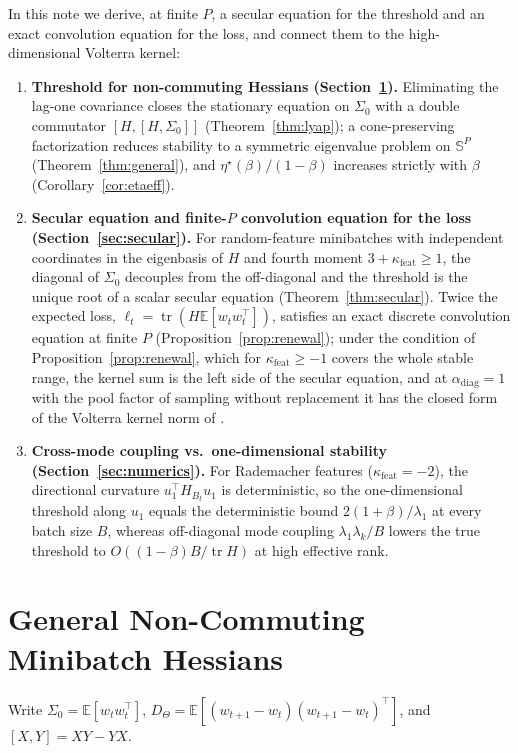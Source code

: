 \documentclass[11pt]{article}
\theoremstyle{remark}
\newcommand{\E}{\mathbb{E}}
\newcommand{\tr}{\operatorname{tr}}
\begin{document}
In this note we derive, at finite $P$, a secular equation for the threshold and an exact convolution equation for the loss, and connect them to the high-dimensional Volterra kernel:
\begin{enumerate}
\item \textbf{Threshold for non-commuting Hessians (Section~\ref{sec:general}).} Eliminating the lag-one covariance closes the stationary equation on $\Sigma_0$ with a double commutator $[H,[H,\Sigma_0]]$ (Theorem~\ref{thm:lyap}); a cone-preserving factorization reduces stability to a symmetric eigenvalue problem on $\mathbb S^P$ (Theorem~\ref{thm:general}), and $\eta^\star(\beta)/(1-\beta)$ increases strictly with $\beta$ (Corollary~\ref{cor:etaeff}).
\item \textbf{Secular equation and finite-$P$ convolution equation for the loss (Section~\ref{sec:secular}).} For random-feature minibatches with independent coordinates in the eigenbasis of $H$ and fourth moment $3+\kappa_{\mathrm{feat}} \ge 1$, the diagonal of $\Sigma_0$ decouples from the off-diagonal and the threshold is the unique root of a scalar secular equation (Theorem~\ref{thm:secular}). Twice the expected loss, $\ell_t = \tr(H\E[w_t w_t^\top])$, satisfies an exact discrete convolution equation at finite $P$ (Proposition~\ref{prop:renewal}); under the condition of Proposition~\ref{prop:renewal}, which for $\kappa_{\mathrm{feat}}\ge-1$ covers the whole stable range, the kernel sum is the left side of the secular equation, and at $\alpha_{\mathrm{diag}}=1$ with the pool factor of sampling without replacement it has the closed form of the Volterra kernel norm of \citet{lee2022minibatch}.
\item \textbf{Cross-mode coupling vs.\ one-dimensional stability (Section~\ref{sec:numerics}).} For Rademacher features ($\kappa_{\mathrm{feat}} = -2$), the directional curvature $u_1^\top H_{B_t} u_1$ is deterministic, so the one-dimensional threshold along $u_1$ equals the deterministic bound $2(1+\beta)/\lambda_1$ at every batch size $B$, whereas off-diagonal mode coupling $\lambda_1\lambda_k/B$ lowers the true threshold to $O((1-\beta)B/\tr H)$ at high effective rank.
\end{enumerate}

\section{General Non-Commuting Minibatch Hessians}\label{sec:general}

Write $\Sigma_0 = \E[w_t w_t^\top]$, $D_\Theta = \E[(w_{t+1}-w_t)(w_{t+1}-w_t)^\top]$, and $[X,Y] = XY - YX$.
\end{document}
